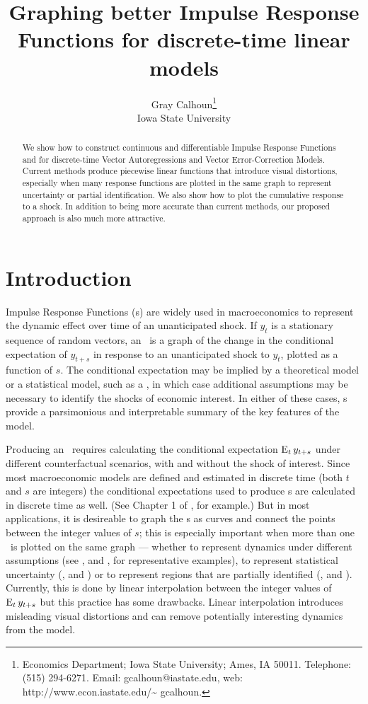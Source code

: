 \documentclass[12pt,fleqn]{article}
\title{Graphing better Impulse Response Functions for discrete-time
  linear models}
\author{Gray Calhoun\thanks{Economics Department; Iowa State
    University; Ames, IA 50011. Telephone: (515) 294-6271.  Email:
    \guillemotleft gcalhoun@iastate.edu\guillemotright, web:
    \guillemotleft http://www.econ.iastate.edu/\textasciitilde
    gcalhoun\guillemotright.} \\
  Iowa State University}
\begin{document}
\maketitle
\begin{abstract}\noindent%
  We show how to construct continuous and differentiable
  Impulse Response Functions and for discrete-time Vector Autoregressions
  and Vector Error-Correction Models. Current methods produce piecewise linear
  functions that introduce visual distortions, especially when many
  response functions are plotted in the same graph to represent
  uncertainty or partial identification. We also show how to plot the
  cumulative response to a shock. In addition to being more accurate
  than current methods, our proposed approach is also much more attractive.
\end{abstract}

\tableofcontents
\newpage

\section{Introduction}
\label{S1}

Impulse Response Functions (\IRF s) are widely used in macroeconomics
to represent the dynamic effect over time of an unanticipated
shock. If $y_t$ is a stationary sequence of random vectors, an \IRF\
is a graph of the change in the conditional expectation of $y_{t+s}$
in response to an unanticipated shock to $y_t$, plotted as a function
of $s$. The conditional expectation may be implied by a theoretical
model or a statistical model, such as a \VAR, in which case additional
assumptions may be necessary to identify the shocks of economic
interest. In either of these cases, \IRF s provide a parsimonious and
interpretable summary of the key features of the model.

Producing an \IRF\ requires calculating the conditional expectation
$\operatorname{E}_t y_{t+s}$ under different counterfactual scenarios, with and
without the shock of interest. Since most macroeconomic models are
defined and estimated in discrete time (both $t$ and $s$ are integers)
the conditional expectations used to produce \IRF s are calculated in
discrete time as well. (See Chapter 1 of \citealp{Ham:94}, for
example.) But in most applications, it is desireable to graph the \IRF
s as curves and connect the points between the integer values of $s$;
this is especially important when more than one \IRF\ is plotted on
the same graph --- whether to represent dynamics under different
assumptions (see \citealp{BeM:98}, and \citealp{StW:01}, for
representative examples), to represent statistical uncertainty
(\citealp{Kil:98}, and \citealp{SiZ:99}) or to represent regions that
are partially identified (\citealp{Uhl:05}, and
\citealp{InK:13}). Currently, this is done by linear interpolation
between the integer values of $\operatorname{E}_t y_{t+s}$ but this practice has
some drawbacks. Linear interpolation introduces misleading visual
distortions and can remove potentially interesting dynamics from the
model.
\end{document}

